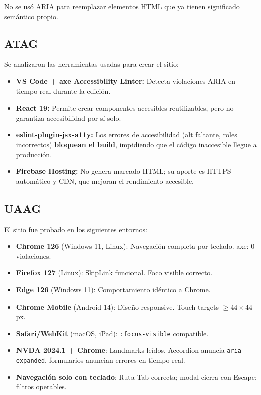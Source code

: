 \documentclass[12pt, a4paper]{article}
\begin{document}
No se usó ARIA para reemplazar elementos HTML que ya tienen significado semántico propio.

\subsection{ATAG}

Se analizaron las herramientas usadas para crear el sitio:

\begin{itemize}
  \item \textbf{VS Code + axe Accessibility Linter:} Detecta violaciones ARIA en tiempo real durante la edición.
  \item \textbf{React 19:} Permite crear componentes accesibles reutilizables, pero no garantiza accesibilidad por sí solo.
  \item \textbf{eslint-plugin-jsx-a11y:} Los errores de accesibilidad (alt faltante, roles incorrectos) \textbf{bloquean el build}, impidiendo que el código inaccesible llegue a producción.
  \item \textbf{Firebase Hosting:} No genera marcado HTML; su aporte es HTTPS automático y CDN, que mejoran el rendimiento accesible.
\end{itemize}

\subsection{UAAG}

El sitio fue probado en los siguientes entornos:

\begin{itemize}
  \item \textbf{Chrome 126} (Windows 11, Linux): Navegación completa por teclado. axe: 0 violaciones.
  \item \textbf{Firefox 127} (Linux): SkipLink funcional. Foco visible correcto.
  \item \textbf{Edge 126} (Windows 11): Comportamiento idéntico a Chrome.
  \item \textbf{Chrome Mobile} (Android 14): Diseño responsive. Touch targets $\geq 44\times44$ px.
  \item \textbf{Safari/WebKit} (macOS, iPad): \texttt{:focus-visible} compatible.
  \item \textbf{NVDA 2024.1 + Chrome}: Landmarks leídos, Accordion anuncia \texttt{aria-expanded}, formularios anuncian errores en tiempo real.
  \item \textbf{Navegación solo con teclado}: Ruta Tab correcta; modal cierra con Escape; filtros operables.
\end{itemize}
\end{document}
